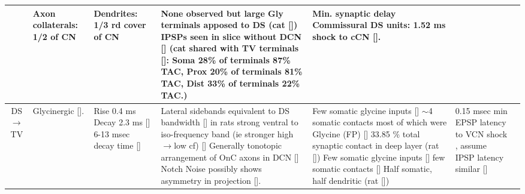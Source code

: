 \begin{longtable}{cYYYYYY}
                                & %
Axon collaterals: 1/2 of CN
                                & %
Dendrites: 1/3 rd cover of CN
                                & %
None observed but large Gly terminals apposed to DS (cat []) 
IPSPs seen in slice without DCN []                     
(cat shared with TV terminals []: 
Soma 28\% of terminals 87\% TAC,
Prox 20\% of terminals 81\% TAC,
Dist 33\% of terminals 22\% TAC.)
                                & 
Min. synaptic delay 
Commissural DS units: 1.52 ms shock to cCN [].
\\ \midrule
DS\ensuremath{\rightarrow}TV                        
                                & %
Glycinergic []. 
                                & 
Rise 0.4 ms Decay 2.3 ms []
6-13 msec decay time []
                                & 
Lateral sidebands equivalent to DS bandwidth
[] 
in rats strong ventral to iso-frequency band (ie stronger high \ensuremath{\rightarrow}low cf)
[] 
Generally tonotopic arrangement of OnC axons in DCN []
Notch Noise possibly shows asymmetry in projection [].      
                                & 
Few somatic glycine inputs 
[]
$\sim$4 somatic contacts most of which were Glycine (FP) []
33.85 \% total synaptic contact in deep layer (rat [])
Few somatic glycine inputs [] 
few  somatic contacts []                   
Half somatic, half dendritic (rat [])
                                & 
0.15 msec min EPSP latency to VCN shock , assume IPSP latency similar
[]\\ \midrule

\end{longtable}
